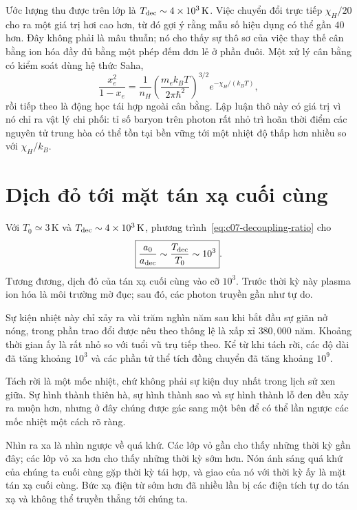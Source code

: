 Ước lượng thu được trên lớp là \(T_{\rm dec}\sim4\times10^3\,\mathrm{K}\). Việc chuyển đổi trực tiếp \(\chi_H/20\) cho ra một giá trị hơi cao hơn, từ đó gợi ý rằng mẫu số hiệu dụng có thể gần \(40\) hơn. Đây không phải là mâu thuẫn; nó cho thấy sự thô sơ của việc thay thế cân bằng ion hóa đầy đủ bằng một phép đếm đơn lẻ ở phần đuôi. Một xử lý cân bằng có kiểm soát dùng hệ thức Saha,
\begin{equation}
\frac{x_e^2}{1-x_e}
=
\frac{1}{n_H}
\left(\frac{m_e k_BT}{2\pi\hbar^2}\right)^{3/2}
e^{-\chi_H/(k_BT)},
\label{eq:c07-saha}
\end{equation}
rồi tiếp theo là động học tái hợp ngoài cân bằng. Lập luận thô này có giá trị vì nó chỉ ra vật lý chi phối: tỉ số baryon trên photon rất nhỏ trì hoãn thời điểm các nguyên tử trung hòa có thể tồn tại bền vững tới một nhiệt độ thấp hơn nhiều so với \(\chi_H/k_B\).

\section{Dịch đỏ tới mặt tán xạ cuối cùng}

Với \(T_0\simeq3\,\mathrm{K}\) và \(T_{\rm dec}\sim4\times10^3\,\mathrm{K}\), phương trình~\eqref{eq:c07-decoupling-ratio} cho
\begin{equation}
\boxed{
\frac{a_0}{a_{\rm dec}}
\sim
\frac{T_{\rm dec}}{T_0}
\sim10^3
}.
\label{eq:c07-decoupling-expansion}
\end{equation}
Tương đương, dịch đỏ của tán xạ cuối cùng vào cỡ \(10^3\). Trước thời kỳ này plasma ion hóa là môi trường mờ đục; sau đó, các photon truyền gần như tự do.

Sự kiện nhiệt này chỉ xảy ra vài trăm nghìn năm sau khi bắt đầu sự giãn nở nóng, trong phần trao đổi được nêu theo thông lệ là xấp xỉ \(380{,}000\) năm. Khoảng thời gian ấy là rất nhỏ so với tuổi vũ trụ tiếp theo. Kể từ khi tách rời, các độ dài đã tăng khoảng \(10^3\) và các phần tử thể tích đồng chuyển đã tăng khoảng \(10^9\).

Tách rời là một mốc nhiệt, chứ không phải sự kiện duy nhất trong lịch sử xen giữa. Sự hình thành thiên hà, sự hình thành sao và sự hình thành lỗ đen đều xảy ra muộn hơn, nhưng ở đây chúng được gác sang một bên để có thể lần ngược các mốc nhiệt một cách rõ ràng.

Nhìn ra xa là nhìn ngược về quá khứ. Các lớp vỏ gần cho thấy những thời kỳ gần đây; các lớp vỏ xa hơn cho thấy những thời kỳ sớm hơn. Nón ánh sáng quá khứ của chúng ta cuối cùng gặp thời kỳ tái hợp, và giao của nó với thời kỳ ấy là mặt tán xạ cuối cùng. Bức xạ điện từ sớm hơn đã nhiều lần bị các điện tích tự do tán xạ và không thể truyền thẳng tới chúng ta.

